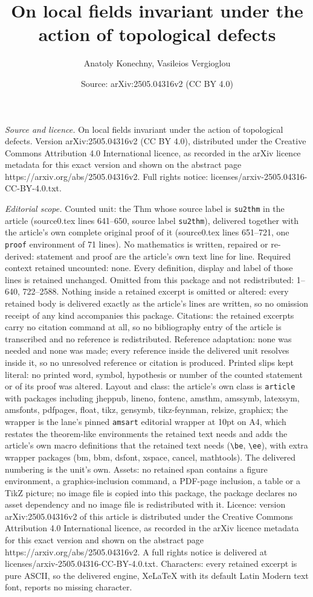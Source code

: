 \documentclass[10pt,a4paper]{amsart}
\title[On local fields invariant under the action of topological de]{On local fields invariant under the action of topological defects}
\author{Anatoly Konechny, Vasileios Vergioglou}
\date{Source: arXiv:2505.04316v2 (CC BY 4.0)}
\begin{document}
\maketitle

\noindent\emph{Source and licence.} On local fields invariant under the action of topological defects. Version arXiv:2505.04316v2 (CC BY 4.0), distributed under the Creative Commons Attribution 4.0 International licence, as recorded in the arXiv licence metadata for this exact version and shown on the abstract page https://arxiv.org/abs/2505.04316v2. Full rights notice: licenses/arxiv-2505.04316-CC-BY-4.0.txt.\par\smallskip

\noindent\textit{Editorial scope.} Counted unit: the Thm whose source label is \texttt{su2thm} in the article (source0.tex lines 641--650, source label \texttt{su2thm}), delivered together with the article's own complete original proof of it (source0.tex lines 651--721, one \texttt{proof} environment of 71 lines). No mathematics is written, repaired or re-derived: statement and proof are the article's own text line for line. Required context retained uncounted: none. Every definition, display and label of those lines is retained unchanged. Omitted from this package and not redistributed: 1--640, 722--2588. Nothing inside a retained excerpt is omitted or altered: every retained body is delivered exactly as the article's lines are written, so no omission receipt of any kind accompanies this package. Citations: the retained excerpts carry no citation command at all, so no bibliography entry of the article is transcribed and no reference is redistributed. Reference adaptation: none was needed and none was made; every reference inside the delivered unit resolves inside it, so no unresolved reference or citation is produced. Printed slips kept literal: no printed word, symbol, hypothesis or number of the counted statement or of its proof was altered. Layout and class: the article's own class is \texttt{article} with packages including jheppub, lineno, fontenc, amsthm, amssymb, latexsym, amsfonts, pdfpages, float, tikz, gensymb, tikz-feynman, relsize, graphicx; the wrapper is the lane's pinned \texttt{amsart} editorial wrapper at 10pt on A4, which restates the theorem-like environments the retained text needs and adds the article's own macro definitions that the retained text needs (\texttt{\textbackslash be}, \texttt{\textbackslash ee}), with extra wrapper packages (bm, bbm, dsfont, xspace, cancel, mathtools). The delivered numbering is the unit's own. Assets: no retained span contains a figure environment, a graphics-inclusion command, a PDF-page inclusion, a table or a TikZ picture; no image file is copied into this package, the package declares no asset dependency and no image file is redistributed with it. Licence: version arXiv:2505.04316v2 of this article is distributed under the Creative Commons Attribution 4.0 International licence, as recorded in the arXiv licence metadata for this exact version and shown on the abstract page https://arxiv.org/abs/2505.04316v2. A full rights notice is delivered at licenses/arxiv-2505.04316-CC-BY-4.0.txt. Characters: every retained excerpt is pure ASCII, so the delivered engine, XeLaTeX with its default Latin Modern text font, reports no missing character.
\end{document}
